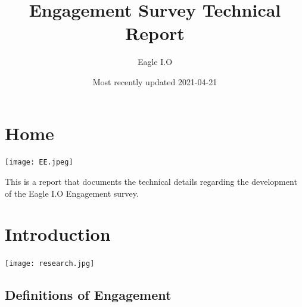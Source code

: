 \documentclass[
]{book}
\title{Engagement Survey Technical Report}
\author{Eagle I.O}
\date{Most recently updated 2021-04-21}
\begin{document}
\maketitle

{
\setcounter{tocdepth}{4}
\tableofcontents
}
\hypertarget{homepage}{%
\chapter{Home}\label{homepage}}

\texttt{[image: EE.jpeg]}

This is a report that documents the technical details regarding the development of the Eagle I.O Engagement survey.

\hypertarget{intro}{%
\chapter{Introduction}\label{intro}}

\texttt{[image: research.jpg]}

\hypertarget{definitions-of-engagement}{%
\section{Definitions of Engagement}\label{definitions-of-engagement}}
\end{document}
